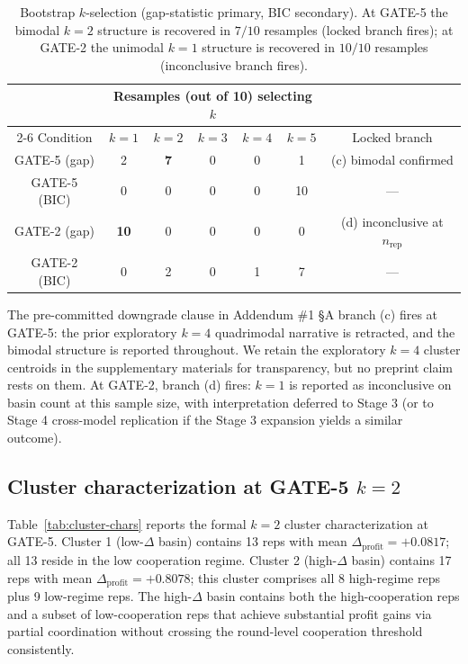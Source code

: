 \begin{table}[h]
\centering
\caption{Bootstrap $k$-selection (gap-statistic primary, BIC secondary). At GATE-5 the bimodal $k=2$ structure is recovered in $7/10$ resamples (locked branch fires); at GATE-2 the unimodal $k=1$ structure is recovered in $10/10$ resamples (inconclusive branch fires).}
\label{tab:k-selection}
\begin{tabular}{ccccccc}
\toprule
& \multicolumn{5}{c}{Resamples (out of 10) selecting $k$} & \\
\cmidrule(lr){2-6}
Condition & $k=1$ & $k=2$ & $k=3$ & $k=4$ & $k=5$ & Locked branch \\
\midrule
GATE-5 (gap)  & 2  & \textbf{7} & 0 & 0 & 1  & (c) bimodal confirmed \\
GATE-5 (BIC)  & 0  & 0          & 0 & 0 & 10 & --- \\
GATE-2 (gap)  & \textbf{10} & 0 & 0 & 0 & 0 & (d) inconclusive at $n_{\text{rep}}$ \\
GATE-2 (BIC)  & 0  & 2          & 0 & 1 & 7  & --- \\
\bottomrule
\end{tabular}
\end{table}

The pre-committed downgrade clause in Addendum \#1 \S A branch (c) fires at GATE-5: the prior exploratory $k = 4$ quadrimodal narrative is retracted, and the bimodal structure is reported throughout. We retain the exploratory $k = 4$ cluster centroids in the supplementary materials for transparency, but no preprint claim rests on them. At GATE-2, branch (d) fires: $k = 1$ is reported as inconclusive on basin count at this sample size, with interpretation deferred to Stage 3 (or to Stage 4 cross-model replication if the Stage 3 expansion yields a similar outcome).

\subsection{Cluster characterization at GATE-5 $k = 2$}
\label{sec:results-clusters}

Table~\ref{tab:cluster-chars} reports the formal $k = 2$ cluster characterization at GATE-5. Cluster 1 (low-$\Delta$ basin) contains 13 reps with mean $\Delta_{\text{profit}} = +0.0817$; all 13 reside in the low cooperation regime. Cluster 2 (high-$\Delta$ basin) contains 17 reps with mean $\Delta_{\text{profit}} = +0.8078$; this cluster comprises all 8 high-regime reps plus 9 low-regime reps. The high-$\Delta$ basin contains both the high-cooperation reps and a subset of low-cooperation reps that achieve substantial profit gains via partial coordination without crossing the round-level cooperation threshold consistently.

